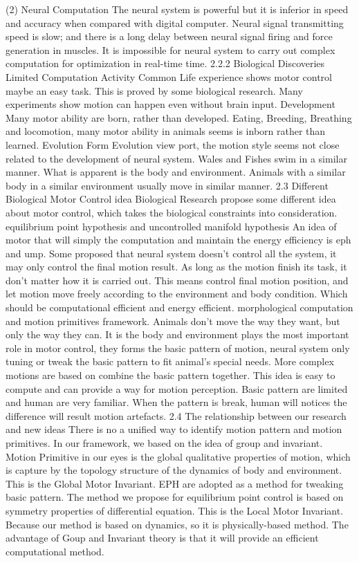 (2) Neural Computation
The neural system is powerful but it is inferior in speed and accuracy when compared with digital computer. Neural signal transmitting speed is slow; and there is a long delay between neural signal firing and force generation in muscles. It is impossible for neural system to carry out complex computation for optimization in real-time time.
2.2.2 Biological Discoveries
Limited Computation Activity
Common Life experience shows motor control maybe an easy task. This is proved by some biological research. Many experiments show motion can happen even without brain input.
Development
Many motor ability are born, rather than developed. Eating, Breeding, Breathing and locomotion, many motor ability in animals seems is inborn rather than learned. 
Evolution
Form Evolution view port, the motion style seems not close related to the development of neural system. Wales and Fishes swim in a similar manner.
What is apparent is the body and environment. Animals with a similar body in a similar environment usually move in similar manner.
2.3 Different Biological Motor Control idea
Biological Research propose some different idea about motor control, which takes the biological constraints into consideration.
 equilibrium point hypothesis and uncontrolled manifold hypothesis
An idea of motor that will simply the computation and maintain the energy efficiency is eph and ump. Some proposed that neural system doesn’t control all the system,  it may only control the final motion result. As long as the motion finish its task, it don’t matter how it is carried out.
This means control final motion position, and let motion move freely according to the environment and body condition. Which should be computational efficient and energy efficient.
 morphological computation and motion primitives framework.
Animals don’t move the way they want, but only the way they can.
It is the body and environment plays the most important role in motor control, they forms the basic pattern of motion, neural system only tuning or tweak the basic pattern to fit animal’s special needs.
More complex motions are based on combine the basic pattern together.
This idea is easy to compute and can provide a way for motion perception.
Basic pattern are limited and human are very familiar. When the pattern is break, human will notices the difference will result motion artefacts.
2.4 The relationship between our research and new ideas
There is no a unified way to identify motion pattern and motion primitives. In our framework, we based on the idea of group and invariant.
Motion Primitive in our eyes is the global qualitative properties of motion, which is capture by the topology structure of the dynamics of body and environment. This is the Global Motor Invariant.
EPH are adopted as a method for tweaking basic pattern. The method we propose for equilibrium point control is based on symmetry properties of differential equation. This is the Local Motor Invariant.
Because our method is based on dynamics, so it is physically-based method. The advantage of Goup and Invariant theory is that it will provide an efficient computational method.